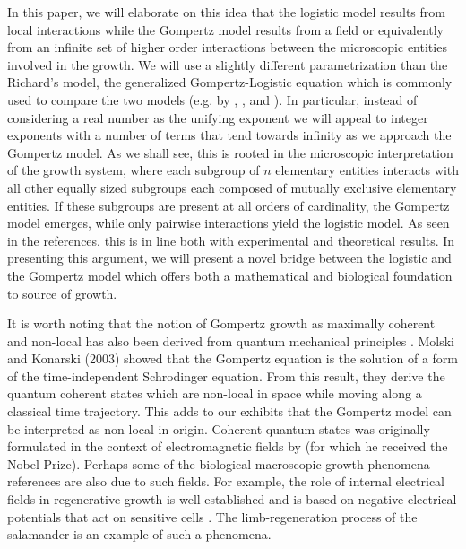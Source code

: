 \documentclass{article}
\begin{document}
In this paper, we will elaborate on this idea that the logistic model results from local interactions while the Gompertz model results from a field or equivalently from an infinite set of higher order interactions between the microscopic entities involved in the growth. We will use a slightly different parametrization than the Richard's model, the generalized Gompertz-Logistic equation which is commonly used to compare the two models (e.g. by \citet{petroni2020logistic}, \citet{tjorve2017use}, and \citet{wang2012richards}). In particular, instead of considering a real number as the unifying exponent we will appeal to integer exponents with a number of terms that tend towards infinity as we approach the Gompertz model. As we shall see, this is rooted in the microscopic interpretation of the growth system, where each subgroup of $n$ elementary entities interacts with all other equally sized subgroups each composed of mutually exclusive elementary entities. If these subgroups are present at all orders of cardinality, the Gompertz model emerges, while only pairwise interactions yield the logistic model. As seen in the references, this is in line both with experimental and theoretical results. In presenting this argument, we will present a novel bridge between the logistic and the Gompertz model which offers both a mathematical and biological foundation to source of growth.

It is worth noting that the notion of Gompertz growth as maximally coherent and non-local has also been derived from quantum mechanical principles \cite{molski2003coherent}. Molski and Konarski (2003) showed that the Gompertz equation is the solution of a form of the time-independent Schrodinger equation. From this result, they derive the quantum coherent states which are non-local in space while moving along a classical time trajectory. This adds to our exhibits that the Gompertz model can be interpreted as non-local in origin. Coherent quantum states was originally formulated in the context of electromagnetic fields by \citet{glauber1963coherent} (for which he received the Nobel Prize). Perhaps some of the biological macroscopic growth phenomena references are also due to such fields. For example, the role of internal electrical fields in regenerative growth is well established and is based on negative electrical potentials that act on sensitive cells \cite{becker1984electromagnetic}. The limb-regeneration process of the salamander is an example of such a phenomena. 
\end{document}
